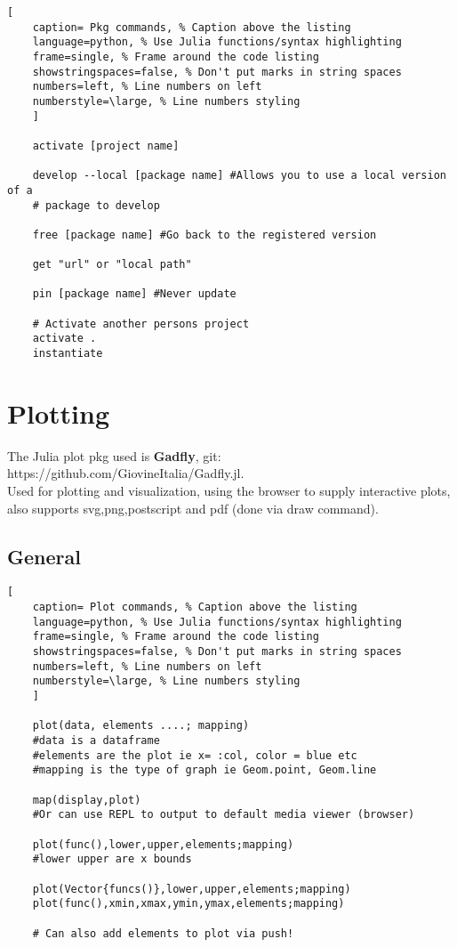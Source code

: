 \documentclass[11pt]{scrartcl} %
\begin{document}
\begin{lstlisting}[
	caption= Pkg commands, % Caption above the listing
	language=python, % Use Julia functions/syntax highlighting
	frame=single, % Frame around the code listing
	showstringspaces=false, % Don't put marks in string spaces
	numbers=left, % Line numbers on left
	numberstyle=\large, % Line numbers styling
	]

	activate [project name]

	develop --local [package name] #Allows you to use a local version of a 
	# package to develop

	free [package name] #Go back to the registered version

	get "url" or "local path"

	pin [package name] #Never update

	# Activate another persons project
	activate .
	instantiate

\end{lstlisting}

\section{Plotting}

The Julia plot pkg used is \textbf{Gadfly}, git: https://github.com/GiovineItalia/Gadfly.jl.\\

Used for plotting and visualization, using the browser to supply interactive plots, also supports
svg,png,postscript and pdf (done via draw command).

\subsection{General}

\begin{lstlisting}[
	caption= Plot commands, % Caption above the listing
	language=python, % Use Julia functions/syntax highlighting
	frame=single, % Frame around the code listing
	showstringspaces=false, % Don't put marks in string spaces
	numbers=left, % Line numbers on left
	numberstyle=\large, % Line numbers styling
	]

	plot(data, elements ....; mapping)
	#data is a dataframe
	#elements are the plot ie x= :col, color = blue etc
	#mapping is the type of graph ie Geom.point, Geom.line

	map(display,plot) 
	#Or can use REPL to output to default media viewer (browser)

	plot(func(),lower,upper,elements;mapping)
	#lower upper are x bounds

	plot(Vector{funcs()},lower,upper,elements;mapping)
	plot(func(),xmin,xmax,ymin,ymax,elements;mapping)

	# Can also add elements to plot via push!

\end{lstlisting}
\end{document}
